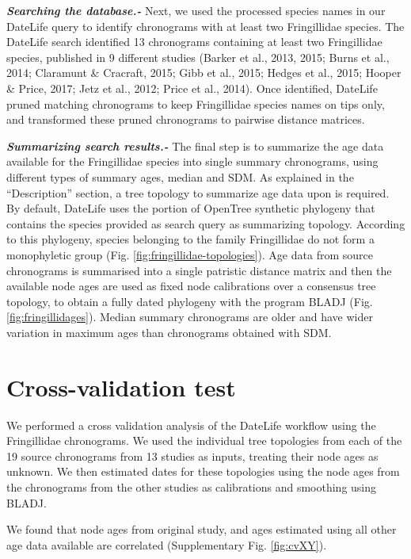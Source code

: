 \documentclass[
  english,
  man]{apa6}
\begin{document}
\emph{\textbf{Searching the database.-}}
Next, we used the processed species names in our DateLife query to identify chronograms with at least two Fringillidae species.
The DateLife search identified 13 chronograms containing at least two Fringillidae species, published in 9 different studies (Barker et al., 2013, 2015; Burns et al., 2014; Claramunt \& Cracraft, 2015; Gibb et al., 2015; Hedges et al., 2015; Hooper \& Price, 2017; Jetz et al., 2012; Price et al., 2014).
Once identified, DateLife pruned matching chronograms to keep Fringillidae species names on tips only, and transformed these pruned chronograms to pairwise distance matrices.

\emph{\textbf{Summarizing search results.-}}
The final step is to summarize the age data available for the Fringillidae species into single summary chronograms, using different types of summary ages, median and SDM.
As explained in the ``Description'' section, a tree topology to summarize age data upon is required.
By default, DateLife uses the portion of OpenTree synthetic phylogeny that contains the species provided as search query as summarizing topology.
According to this phylogeny, species belonging to the family Fringillidae do not form a monophyletic group (Fig. \ref{fig:fringillidae-topologies}).
Age data from source chronograms is summarised into a single patristic distance matrix and then the available node ages are used as fixed node calibrations over a consensus tree topology, to obtain a fully dated phylogeny with the program BLADJ (Fig. \ref{fig:fringillidages}).
Median summary chronograms are older and have wider variation in maximum ages than chronograms obtained with SDM.

\hypertarget{cross-validation-test}{%
\section{Cross-validation test}\label{cross-validation-test}}

We performed a cross validation analysis of the DateLife workflow using the Fringillidae chronograms.
We used the individual tree topologies from each of the 19 source chronograms from 13 studies as inputs, treating their node ages as unknown.
We then estimated dates for these topologies using the node ages from the chronograms from the other studies as calibrations and smoothing using BLADJ.

We found that node ages from original study, and ages estimated using all other age data available are correlated (Supplementary Fig. \ref{fig:cvXY}).
\end{document}
